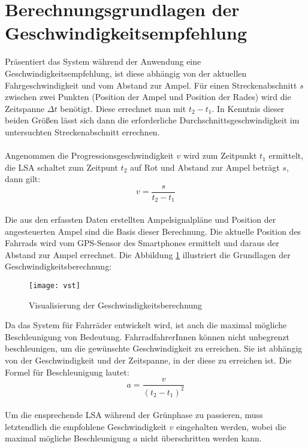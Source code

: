 \section{\label{sec:mathGrundlagen}Berechnungsgrundlagen der Geschwindigkeitsempfehlung}
Präsentiert das System während der Anwendung eine Geschwindigkeitsempfehlung, ist diese abhängig von der aktuellen Fahrgeschwindigkeit und vom Abstand zur Ampel. Für einen Streckenabschnitt $s$ zwischen zwei Punkten (Position der Ampel und Position der Rades) wird die Zeitspanne $\Delta t$ benötigt. Diese errechnet man mit $t_{2} - t_{1}$. In Kenntnis dieser beiden Größen lässt sich dann die erforderliche Durchschnittsgeschwindigkeit im untersuchten Streckenabschnitt errechnen.\\\\ 
Angenommen die \gls{Progressionsgeschwindigkeit} $v$ wird zum Zeitpunkt $t_{1}$ ermittelt, die \gls {LSA} schaltet zum Zeitpunt $t_{2}$ auf Rot und Abstand zur Ampel beträgt $s$, dann gilt: \\
\[ v = \frac{s}{t_{2} - t_{1}} \] \\
Die aus den erfassten Daten erstellten Ampelsignalpläne und Position der angesteuerten Ampel sind die Basis dieser Berechnung. Die aktuelle Position des Fahrrads wird vom \gls{GPS}-Sensor des \glspl{Smartphone} ermittelt und daraus der Abstand zur Ampel errechnet. Die Abbildung \ref{fig:vst} illustriert die Grundlagen der Geschwindigkeitsberechnung: \\
\begin{figure}[H]  
    \centering  
    \texttt{[image: vst]}  
    \grayRule
    \caption[Berechnung \gls{Progressionsgeschwindigkeit}]{Visualisierung der Geschwindigkeitsberechnung}
    \label{fig:vst}
\end{figure}
\clearpage
Da das System für Fahrräder entwickelt wird, ist auch die maximal mögliche Beschleunigung von Bedeutung. FahrradfahrerInnen können nicht unbegrenzt beschleunigen, um die gewünschte Geschwindigkeit zu erreichen. Sie ist abhängig von der Geschwindigkeit und der Zeitspanne, in der diese zu erreichen ist. Die Formel für Beschleunigung lautet:
\[ a = \frac{v}{(t_{2} - t_{1})^{2}} \]\\
 Um die ensprechende \gls{LSA} während der Grünphase zu passieren, muss letztendlich die empfohlene Geschwindigkeit $v$ eingehalten werden, wobei die maximal mögliche Beschleunigung $a$ nicht überschritten werden kann.
